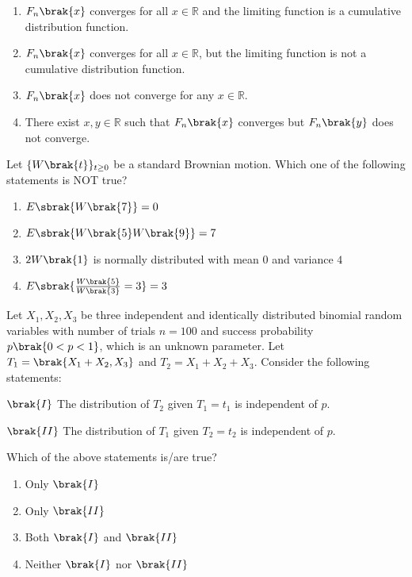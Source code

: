\begin{enumerate}
    \item $F_n\brak{x}$ converges for all $x \in \mathbb{R}$ and the limiting function is a cumulative distribution function.
    \item $F_n\brak{x}$ converges for all $x \in \mathbb{R}$, but the limiting function is not a cumulative distribution function.
    \item $F_n\brak{x}$ does not converge for any $x \in \mathbb{R}$.
    \item There exist $x, y \in \mathbb{R}$ such that $F_n\brak{x}$ converges but $F_n\brak{y}$ does not converge.
\end{enumerate}

\item Let $\{W\brak{t}\}_{t\geq 0}$ be a standard Brownian motion. Which one of the following statements is NOT true?

\begin{enumerate}
    \item $E\sbrak{W\brak{7}} = 0$
    \item $E\sbrak{W\brak{5}W\brak{9}} = 7$
    \item $2W\brak{1}$ is normally distributed with mean $0$ and variance $4$
    \item $E\sbrak{\frac{W\brak{5}}{W\brak{3}} = 3} = 3$
\end{enumerate}

\item Let $X_1, X_2, X_3$ be three independent and identically distributed binomial random variables with number of trials $n = 100$ and success probability $p \brak{0 < p < 1}$, which is an unknown parameter. Let $T_1 = \brak{X_1 + X_2, X_3}$ and $T_2 = X_1 + X_2 + X_3$. Consider the following statements:

$\brak{I}$ The distribution of $T_2$ given $T_1 = t_1$ is independent of $p$.

$\brak{II}$ The distribution of $T_1$ given $T_2 = t_2$ is independent of $p$.

Which of the above statements is/are true?

\begin{enumerate}
    \item Only $\brak{I}$
    \item Only $\brak{II}$
    \item Both $\brak{I}$ and $\brak{II}$
    \item Neither $\brak{I}$ nor $\brak{II}$
\end{enumerate}

